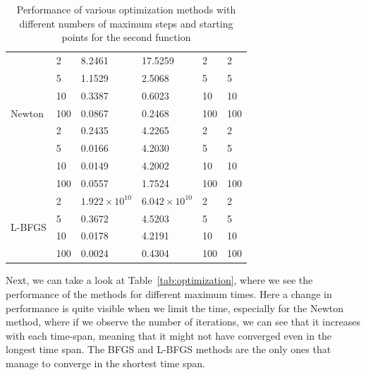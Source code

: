 \documentclass[9pt]{IEEEtran}
\begin{document}
\begin{table}[h!]
\begin{tabular}{|p{1cm}|p{1cm}|p{1.7cm}|p{1.7cm}|p{0.5cm}|p{0.5cm}|}
        \multirow{7}{*}{Newton}          & 2  & 8.2461   & 17.5259  & 2  & 2 \\ \cline{2-6} 
                                       & 5  & 1.1529   & 2.5068   & 5  & 5 \\ \cline{2-6} 
                                       & 10 & 0.3387   & 0.6023   & 10 & 10 \\ \cline{2-6} 
                                       & 100 & 0.0867   & 0.2468   & 100 & 100 \\ \hline
        \multirow{7}{*}{BFGS}            & 2  & 0.2435   & 4.2265   & 2  & 2 \\ \cline{2-6} 
                                       & 5  & 0.0166   & 4.2030   & 5  & 5 \\ \cline{2-6} 
                                       & 10 & 0.0149   & 4.2002   & 10 & 10 \\ \cline{2-6} 
                                       & 100 & 0.0557   & 1.7524   & 100 & 100 \\ \hline
        \multirow{7}{*}{L-BFGS}          & 2  & \( 1.922 \times 10^{10} \) & \( 6.042 \times 10^{10} \) & 2  & 2 \\ \cline{2-6} 
                                       & 5  & 0.3672   & 4.5203   & 5  & 5 \\ \cline{2-6} 
                                       & 10 & 0.0178   & 4.2191   & 10 & 10 \\ \cline{2-6} 
                                       & 100 & 0.0024   & 0.4304   & 100 & 100 \\ \hline
    \end{tabular}
    \hspace{2pt}
    \caption{Performance of various optimization methods with different numbers of maximum steps and starting points for the second 
    function}
    \label{tab:f2}
\end{table}


Next, we can take a look at Table~\ref{tab:optimization}, where we see the performance of the methods 
for different maximum times. Here a change in performance is quite visible when we limit the time, 
especially for the Newton method, where if we observe the number of iterations, we can see that it 
increases with each time-span, meaning that it might not have converged even in the longest time span.
 The BFGS and L-BFGS methods are the only ones that manage to converge in 
the shortest time span.
\end{document}
